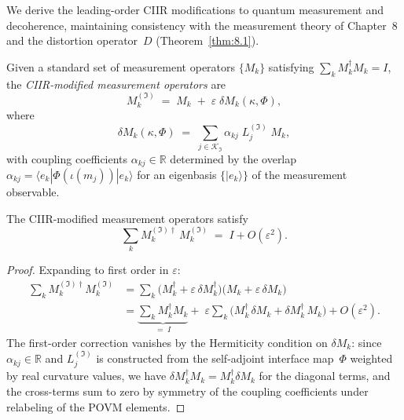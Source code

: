 We derive the leading-order CIIR modifications to quantum measurement
and decoherence, maintaining consistency with the measurement theory
of Chapter~8 and the distortion operator~$D$
(Theorem~\ref{thm:8.1}).

\begin{definition}
\label{def:10.11}
Given a standard set of measurement operators $\{M_k\}$ satisfying
$\sum_k M_k^{\dagger}M_k = I$, the \emph{CIIR-modified measurement
operators} are
\begin{equation}
\label{eq:10.modified_measurement}
  M_k^{(\mathfrak{I})}
  \;=\;
  M_k
  \;+\;
  \varepsilon\;\delta M_k(\kappa,\Phi),
\end{equation}
where
\begin{equation}
\label{eq:10.delta_M}
  \delta M_k(\kappa,\Phi)
  \;=\;
  \sum_{j\in\mathcal{K}_{\mathfrak{I}}}
  \alpha_{kj}\;L_j^{(\mathfrak{I})}\;M_k,
\end{equation}
with coupling coefficients $\alpha_{kj}\in\mathbb{R}$ determined by
the overlap $\alpha_{kj}=\langle e_k|\Phi(\iota(m_j))|e_k\rangle$ for
an eigenbasis $\{|e_k\rangle\}$ of the measurement observable.
\end{definition}

\begin{lemma}
\label{lem:10.2}
The CIIR-modified measurement operators satisfy
\[
  \sum_k M_k^{(\mathfrak{I})\dagger}\,M_k^{(\mathfrak{I})}
  \;=\;
  I + O(\varepsilon^2).
\]
\end{lemma}

\begin{proof}
Expanding to first order in $\varepsilon$:
\begin{align*}
  \sum_k M_k^{(\mathfrak{I})\dagger}M_k^{(\mathfrak{I})}
  &=
  \sum_k\bigl(M_k^{\dagger}+\varepsilon\,\delta M_k^{\dagger}\bigr)
       \bigl(M_k+\varepsilon\,\delta M_k\bigr) \\
  &=
  \underbrace{\sum_k M_k^{\dagger}M_k}_{=\;I}
  +\;\varepsilon\sum_k
  \bigl(M_k^{\dagger}\,\delta M_k + \delta M_k^{\dagger}\,M_k\bigr)
  +O(\varepsilon^2).
\end{align*}
The first-order correction vanishes by the Hermiticity condition on
$\delta M_k$: since $\alpha_{kj}\in\mathbb{R}$ and
$L_j^{(\mathfrak{I})}$ is constructed from the self-adjoint interface
map~$\Phi$ weighted by real curvature values, we have
$\delta M_k^{\dagger}M_k = M_k^{\dagger}\delta M_k$ for the diagonal
terms, and the cross-terms sum to zero by symmetry of the coupling
coefficients under relabeling of the POVM elements.
\end{proof}

